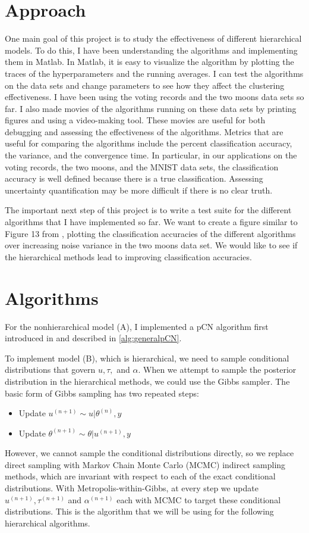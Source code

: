 \documentclass{siamart1116}
\begin{document}
\section{Approach}
One main goal of this project is to study the effectiveness of different hierarchical models. To do this, I have been understanding the algorithms and implementing them in Matlab. In Matlab, it is easy to visualize the algorithm by plotting the traces of the hyperparameters and the running averages. I can test the algorithms on the data sets and change parameters to see how they affect the clustering effectiveness. I have been using the voting records and the two moons data sets so far. I also made movies of the algorithms running on these data sets by printing figures and using a video-making tool. These movies are useful for both debugging and assessing the effectiveness of the algorithms. Metrics that are useful for comparing the algorithms include the percent classification accuracy, the variance, and the convergence time. In particular, in our applications on the voting records, the two moons, and the MNIST data sets, the classification accuracy is well defined because there is a true classification. Assessing uncertainty quantification may be more difficult if there is no clear truth.

The important next step of this project is to write a test suite for the different algorithms that I have implemented so far. We want to create a figure similar to Figure 13 from \cite{BeLuStZy17}, plotting the classification accuracies of the different algorithms over increasing noise variance in the two moons data set. We would like to see if the hierarchical methods lead to improving classification accuracies.

\section{Algorithms}
For the nonhierarchical model (A), I implemented a pCN algorithm first introduced in \cite{BeRoStVo08} and described in \cref{alg:generalpCN}.

To implement model (B), which is hierarchical, we need to sample conditional distributions that govern $u, \tau,$ and $\alpha$. When we attempt to sample the posterior distribution in the hierarchical methods, we could use the Gibbs sampler. The basic form of Gibbs sampling has two repeated steps:
\begin{itemize}
\item Update $u^{(n+1)} \sim u|\theta^{(n)}, y$
\item Update $\theta^{(n+1)} \sim \theta|u^{(n+1)}, y$
\end{itemize}
However, we cannot sample the conditional distributions directly, so we replace direct sampling with Markov Chain Monte Carlo (MCMC) indirect sampling methods, which are invariant with respect to each of the exact conditional distributions. With Metropolis-within-Gibbs, at every step we update $u^{(n+1)}, \tau^{(n+1)}$ and $\alpha^{(n+1)}$ each with MCMC to target these conditional distributions. This is the algorithm that we will be using for the following hierarchical algorithms.
\end{document}
